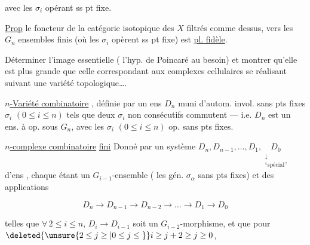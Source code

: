 
avec les $\sigma_i$ opérant ss pt fixe.

\uline{Prop} le foncteur de la catégorie isotopique des  $X$ filtrés comme dessus, vers les $G_n$ ensembles finis (où les $\sigma_i$ opèrent ss pt fixe) est \uline{pl. fidèle}.

Déterminer l'image essentielle ( l'hyp. de Poincaré au besoin) et montrer qu'elle est plus grande que celle correspondant aux complexes cellulaires se réalisant suivant une variété topologique\ldots.

\uline{$n$-Variété combinatoire} , définie par un ens  $D_n$ muni d'autom. invol. sans pts fixes $\sigma_i$ $(0\leq i\leq n)$ tels que deux $\sigma_i$ \unsure{:} non consécutifs commutent --- i.e. $D_n$ est un ens. à op. sous $G_n$, avec les $\sigma_i$ $(0\leq i\leq n)$ op. sans pts fixes.

\uline{$n$-complexe combinatoire} \uline{fini} Donné par un système $D_n,D_{n-1},\ldots,D_1,\underset{\substack{\downarrow\\\text{``spécial''}}}{D_0}$ d'ens , chaque  étant un  $G_{i-1}$-ensemble ( les gén. $\sigma_\alpha$  sans pts fixes) et des applications

\[
 D_n\to D_{n-1}\longrightarrow D_{n-2}\longrightarrow\ldots\longrightarrow D_1\longrightarrow D_0
\]

telles que $\forall\,2\leq i\leq n$, $D_i\to D_{i-1}$ soit un $G_{i-2}$-morphisme, et que pour $\deleted{\unsure{2\leq j\geq{}|0\leq j\leq{}}}i\geq j+2\geq j\geq0$,

